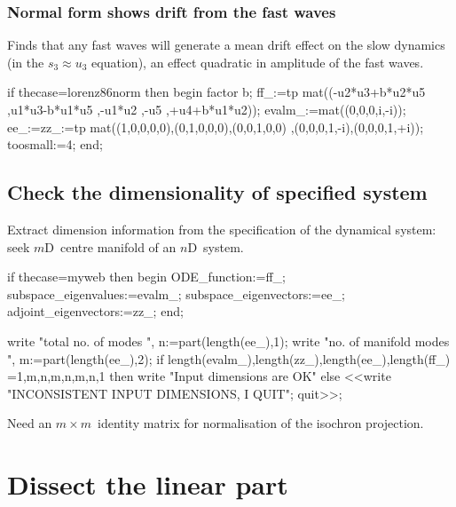 \documentclass[11pt,a5paper]{article}
\begin{document}
\subsubsection{Normal form shows drift from the fast waves}

Finds that any fast waves will generate a mean drift effect on the slow dynamics (in the \(s_3\approx u_3\) equation), an effect quadratic in amplitude of the fast waves.

\begin{reduce}
if thecase=lorenz86norm then begin
factor b;
ff_:=tp mat((-u2*u3+b*u2*u5
    ,u1*u3-b*u1*u5
    ,-u1*u2
    ,-u5
    ,+u4+b*u1*u2));
evalm_:=mat((0,0,0,i,-i));
ee_:=zz_:=tp mat((1,0,0,0,0),(0,1,0,0,0),(0,0,1,0,0)
    ,(0,0,0,1,-i),(0,0,0,1,+i));
toosmall:=4;
end;
\end{reduce}






 


\subsection{Check the dimensionality of specified system}
Extract dimension information from the specification of the dynamical system: seek $m$D~centre manifold of an $n$D~system.

\begin{reduce}
if thecase=myweb then begin
  ODE_function:=ff_; 
  subspace_eigenvalues:=evalm_;
  subspace_eigenvectors:=ee_; 
  adjoint_eigenvectors:=zz_;
end;
\end{reduce}

\begin{reduce}
write "total no. of modes  ",
n:=part(length(ee_),1);
write "no. of manifold modes ",
m:=part(length(ee_),2);
if {length(evalm_),length(zz_),length(ee_),length(ff_)}
  ={{1,m},{n,m},{n,m},{n,1}} 
  then write "Input dimensions are OK" 
  else <<write "INCONSISTENT INPUT DIMENSIONS, I QUIT"; 
      quit>>;
\end{reduce}


Need an \(m\times m\)~identity matrix for normalisation of the isochron projection.


\section{Dissect the linear part}
\end{document}
